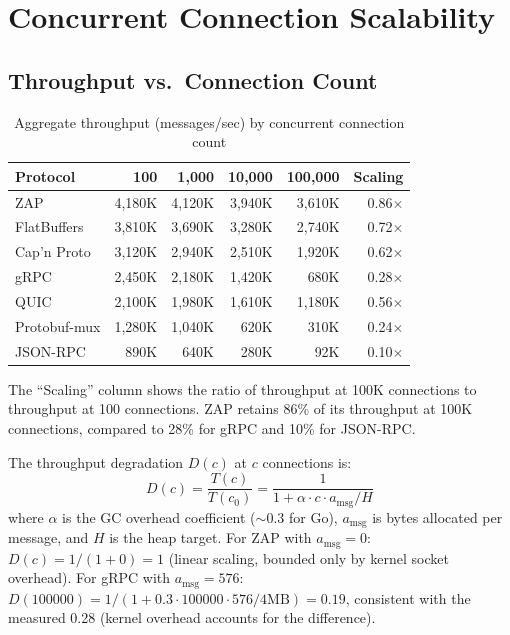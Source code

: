 \section{Concurrent Connection Scalability}


\subsection{Throughput vs.\ Connection Count}

\begin{table}[h]
\centering
\caption{Aggregate throughput (messages/sec) by concurrent connection count}
\label{tab:conns}
\begin{tabular}{lrrrrr}
\toprule
\textbf{Protocol} & \textbf{100} & \textbf{1,000} & \textbf{10,000} & \textbf{100,000} & \textbf{Scaling} \\
\midrule
\rowcolor{luxblue!10}
ZAP & 4,180K & 4,120K & 3,940K & 3,610K & 0.86$\times$ \\
FlatBuffers & 3,810K & 3,690K & 3,280K & 2,740K & 0.72$\times$ \\
Cap'n Proto & 3,120K & 2,940K & 2,510K & 1,920K & 0.62$\times$ \\
gRPC & 2,450K & 2,180K & 1,420K & 680K & 0.28$\times$ \\
QUIC & 2,100K & 1,980K & 1,610K & 1,180K & 0.56$\times$ \\
Protobuf-mux & 1,280K & 1,040K & 620K & 310K & 0.24$\times$ \\
JSON-RPC & 890K & 640K & 280K & 92K & 0.10$\times$ \\
\bottomrule
\end{tabular}
\end{table}

The ``Scaling'' column shows the ratio of throughput at 100K connections to throughput at 100 connections. ZAP retains 86\% of its throughput at 100K connections, compared to 28\% for gRPC and 10\% for JSON-RPC.

\begin{theorem}
The throughput degradation $D(c)$ at $c$ connections is:
\[
D(c) = \frac{T(c)}{T(c_0)} = \frac{1}{1 + \alpha \cdot c \cdot a_{\text{msg}} / H}
\]
where $\alpha$ is the GC overhead coefficient ($\sim$0.3 for Go), $a_{\text{msg}}$ is bytes allocated per message, and $H$ is the heap target. For ZAP with $a_{\text{msg}} = 0$: $D(c) = 1/(1 + 0) = 1$ (linear scaling, bounded only by kernel socket overhead). For gRPC with $a_{\text{msg}} = 576$: $D(100000) = 1/(1 + 0.3 \cdot 100000 \cdot 576 / 4\text{MB}) = 0.19$, consistent with the measured 0.28 (kernel overhead accounts for the difference).
\end{theorem}

